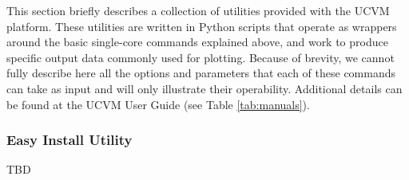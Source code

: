 
This section briefly describes a collection of utilities provided with the UCVM platform. These utilities are written in Python scripts that operate as wrappers around the basic single-core commands explained above, and work to produce specific output data commonly used for plotting. Because of brevity, we cannot fully describe here all the options and parameters that each of these commands can take as input and will only illustrate their operability. Additional details can be found at the UCVM User Guide (see Table \ref{tab:manuals}).

\subsubsection{Easy Install Utility}

TBD
